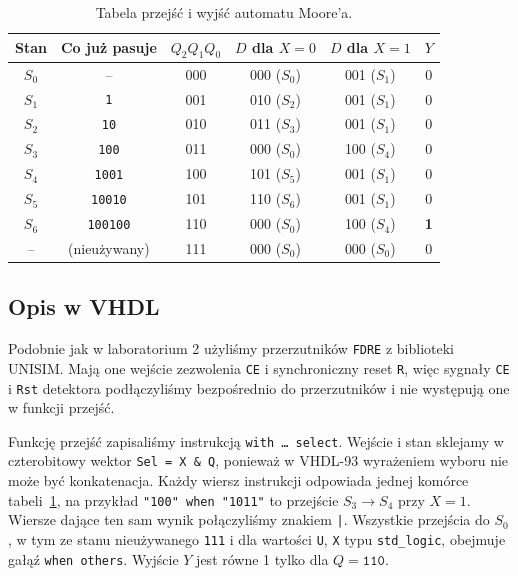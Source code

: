 \documentclass[11pt,a4paper]{article}
\begin{document}
\begin{table}[H]
\centering
\small
\begin{tabular}{cccccc}
\toprule
Stan & Co już pasuje & $Q_2Q_1Q_0$ & $D$ dla $X = 0$ & $D$ dla $X = 1$ & $Y$\\
\midrule
$S_0$ & -- & 000 & 000 ($S_0$) & 001 ($S_1$) & 0\\
$S_1$ & \texttt{1} & 001 & 010 ($S_2$) & 001 ($S_1$) & 0\\
$S_2$ & \texttt{10} & 010 & 011 ($S_3$) & 001 ($S_1$) & 0\\
$S_3$ & \texttt{100} & 011 & 000 ($S_0$) & 100 ($S_4$) & 0\\
$S_4$ & \texttt{1001} & 100 & 101 ($S_5$) & 001 ($S_1$) & 0\\
$S_5$ & \texttt{10010} & 101 & 110 ($S_6$) & 001 ($S_1$) & 0\\
$S_6$ & \texttt{100100} & 110 & 000 ($S_0$) & 100 ($S_4$) & \textbf{1}\\
-- & (nieużywany) & 111 & 000 ($S_0$) & 000 ($S_0$) & 0\\
\bottomrule
\end{tabular}
\caption{Tabela przejść i wyjść automatu Moore'a.}
\label{tab:moore}
\end{table}

\subsection{Opis w VHDL}

Podobnie jak w laboratorium 2 użyliśmy przerzutników \texttt{FDRE} z biblioteki UNISIM. Mają one wejście zezwolenia \texttt{CE} i synchroniczny reset \texttt{R}, więc sygnały \texttt{CE} i \texttt{Rst} detektora podłączyliśmy bezpośrednio do przerzutników i nie występują one w funkcji przejść.

Funkcję przejść zapisaliśmy instrukcją \texttt{with \dots\ select}. Wejście i stan sklejamy w czterobitowy wektor \texttt{Sel = X \& Q}, ponieważ w VHDL-93 wyrażeniem wyboru nie może być konkatenacja. Każdy wiersz instrukcji odpowiada jednej komórce tabeli~\ref{tab:moore}, na przykład \texttt{"100" when "1011"} to przejście $S_3 \to S_4$ przy $X = 1$. Wiersze dające ten sam wynik połączyliśmy znakiem \texttt{|}. Wszystkie przejścia do $S_0$, w tym ze stanu nieużywanego \texttt{111} i dla wartości \texttt{U}, \texttt{X} typu \texttt{std\_logic}, obejmuje gałąź \texttt{when others}. Wyjście $Y$ jest równe 1 tylko dla $Q = \texttt{110}$.


\end{document}
